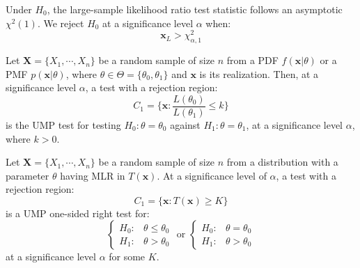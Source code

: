 \documentclass{huhtakm-template-book-v2}
\begin{document}
\begin{thm}
	Under $H_{0}$, the large-sample likelihood ratio test statistic follows an asymptotic $\chi^{2}(1)$. We reject $H_{0}$ at a significance level $\alpha$ when:
	\begin{equation*}
		\mathbf{x}_{L}>\chi^{2}_{\alpha,1}
	\end{equation*}
\end{thm}
\begin{lem}
	Let $\mathbf{X}=\{X_{1},\cdots,X_{n}\}$ be a random sample of size $n$ from a PDF $f(\mathbf{x}|\theta)$ or a PMF $p(\mathbf{x}|\theta)$, where $\theta\in\Theta=\{\theta_{0},\theta_{1}\}$ and $\mathbf{x}$ is its realization. Then, at a significance level $\alpha$, a test with a rejection region:
	\begin{equation*}
		C_{1}=\biggl\{\mathbf{x}:\frac{L(\theta_{0})}{L(\theta_{1})}\leq k\biggr\}
	\end{equation*}
	is the UMP test for testing $H_{0}:\theta=\theta_{0}$ against $H_{1}:\theta=\theta_{1}$, at a significance level $\alpha$, where $k>0$.
\end{lem}
\begin{thm}
	Let $\mathbf{X}=\{X_{1},\cdots,X_{n}\}$ be a random sample of size $n$ from a distribution with a parameter $\theta$ having MLR in $T(\mathbf{x})$. At a significance level of $\alpha$, a test with a rejection region:
	\begin{equation*}
		C_{1}=\{\mathbf{x}:T(\mathbf{x})\geq K\}
	\end{equation*}
	is a UMP one-sided right test for:
	\begin{equation*}
		\begin{cases}
			H_{0}: &\theta\leq\theta_{0}\\
			H_{1}: &\theta>\theta_{0}
		\end{cases}\text{ or }\begin{cases}
			H_{0}: &\theta=\theta_{0}\\
			H_{1}: &\theta>\theta_{0}
		\end{cases}
	\end{equation*}
	at a significance level $\alpha$ for some $K$.
\end{thm}
\end{document}
